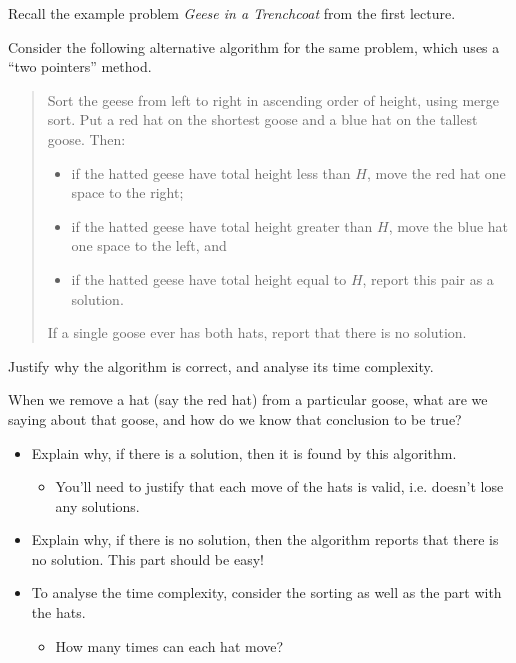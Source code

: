 \documentclass[12pt]{article}
\begin{document}

\begin{question}
Recall the example problem \emph{Geese in a Trenchcoat} from the first lecture.

Consider the following alternative algorithm for the same problem, which uses a ``two pointers'' method.

\begin{quote}
    Sort the geese from left to right in ascending order of height, using merge sort. Put a red hat on the shortest goose and a blue hat on the tallest goose. Then:
    \begin{itemize}
        \item if the hatted geese have total height less than $H$, move the red hat one space to the right;
        \item if the hatted geese have total height greater than $H$, move the blue hat one space to the left, and
        \item if the hatted geese have total height equal to $H$, report this pair as a solution.
    \end{itemize}
    If a single goose ever has both hats, report that there is no solution.
\end{quote}

Justify why the algorithm is correct, and analyse its time complexity.

\hint When we remove a hat (say the red hat) from a particular goose, what are we saying about that goose, and how do we know that conclusion to be true?
\end{question}
\begin{rubric}
\begin{itemize}
    \item Explain why, if there is a solution, then it is found by this algorithm.
    \begin{itemize}
        \item You'll need to justify that each move of the hats is valid, i.e. doesn't lose any solutions.
    \end{itemize}
    \item Explain why, if there is no solution, then the algorithm reports that there is no solution. This part should be easy!
    \item To analyse the time complexity, consider the sorting as well as the part with the hats.
    \begin{itemize}
        \item How many times can each hat move?
    \end{itemize}
\end{itemize}
\end{rubric}
\clearpage
\begin{solution}
\end{solution}
\begin{attribution}
\end{attribution}
\end{document}
